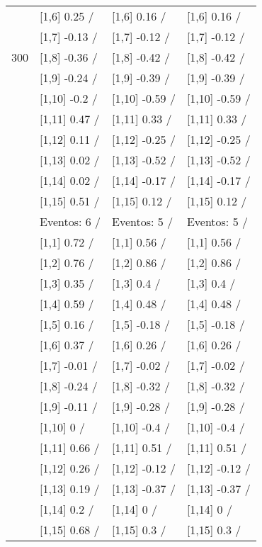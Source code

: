 \begin{table}
\begin{tabular}[t]{llll}
 & {}[1,6] 0.25  / & {}[1,6] 0.16  / & {}[1,6] 0.16  /\\
 & {}[1,7] -0.13  / & {}[1,7] -0.12  / & {}[1,7] -0.12  /\\
300 & {}[1,8] -0.36  / & {}[1,8] -0.42  / & {}[1,8] -0.42  /\\
\addlinespace
 & {}[1,9] -0.24  / & {}[1,9] -0.39  / & {}[1,9] -0.39  /\\
 & {}[1,10] -0.2  / & {}[1,10] -0.59  / & {}[1,10] -0.59  /\\
 & {}[1,11] 0.47  / & {}[1,11] 0.33  / & {}[1,11] 0.33  /\\
 & {}[1,12] 0.11  / & {}[1,12] -0.25  / & {}[1,12] -0.25  /\\
 & {}[1,13] 0.02  / & {}[1,13] -0.52  / & {}[1,13] -0.52  /\\
\addlinespace
 & {}[1,14] 0.02  / & {}[1,14] -0.17  / & {}[1,14] -0.17  /\\
 & {}[1,15] 0.51  / & {}[1,15] 0.12  / & {}[1,15] 0.12  /\\
 & Eventos:  6 / & Eventos:  5 / & Eventos:  5 /\\
 & {}[1,1] 0.72  / & {}[1,1] 0.56  / & {}[1,1] 0.56  /\\
 & {}[1,2] 0.76  / & {}[1,2] 0.86  / & {}[1,2] 0.86  /\\
\addlinespace
 & {}[1,3] 0.35  / & {}[1,3] 0.4  / & {}[1,3] 0.4  /\\
 & {}[1,4] 0.59  / & {}[1,4] 0.48  / & {}[1,4] 0.48  /\\
 & {}[1,5] 0.16  / & {}[1,5] -0.18  / & {}[1,5] -0.18  /\\
 & {}[1,6] 0.37  / & {}[1,6] 0.26  / & {}[1,6] 0.26  /\\
 & {}[1,7] -0.01  / & {}[1,7] -0.02  / & {}[1,7] -0.02  /\\
\addlinespace
500 & {}[1,8] -0.24  / & {}[1,8] -0.32  / & {}[1,8] -0.32  /\\
 & {}[1,9] -0.11  / & {}[1,9] -0.28  / & {}[1,9] -0.28  /\\
 & {}[1,10] 0  / & {}[1,10] -0.4  / & {}[1,10] -0.4  /\\
 & {}[1,11] 0.66  / & {}[1,11] 0.51  / & {}[1,11] 0.51  /\\
 & {}[1,12] 0.26  / & {}[1,12] -0.12  / & {}[1,12] -0.12  /\\
\addlinespace
 & {}[1,13] 0.19  / & {}[1,13] -0.37  / & {}[1,13] -0.37  /\\
 & {}[1,14] 0.2  / & {}[1,14] 0  / & {}[1,14] 0  /\\
 & {}[1,15] 0.68  / & {}[1,15] 0.3  / & {}[1,15] 0.3  /\\
\bottomrule
\end{tabular}
\end{table}
